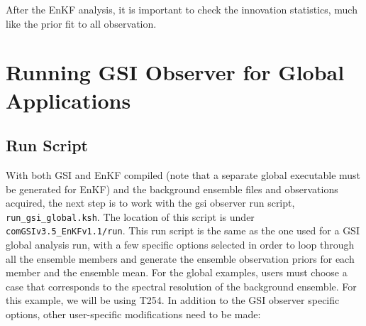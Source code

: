 \begin{enumerate}
After the EnKF analysis, it is important to check the innovation statistics, much like the prior fit to all observation.
\end{enumerate}

\section{Running GSI Observer for Global Applications}

\subsection{Run Script}

With both GSI and EnKF compiled (note that a separate global executable must be generated for EnKF) and the background ensemble files and observations acquired, the next step is to work with the gsi observer run script, \verb|run_gsi_global.ksh|. The location of this script is under \verb|comGSIv3.5_EnKFv1.1/run|. This run script is the same as the one used for a GSI global analysis run, with a few specific options selected in order to loop through all the ensemble members and generate the ensemble observation priors for each member and the ensemble mean. For the global examples, users must choose a case that corresponds to the spectral resolution of the background ensemble. For this example, we will be using T254. In addition to the GSI observer specific options, other user-specific modifications need to be made:

